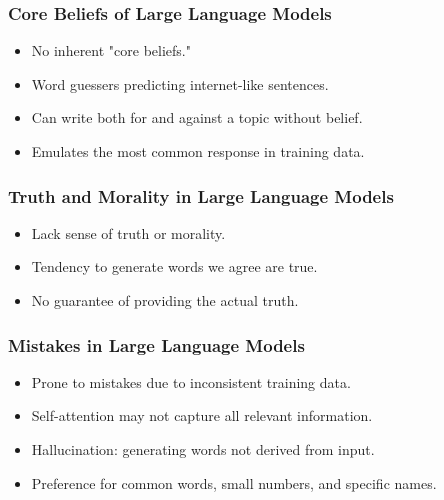 
\begin{frame}[fragile]\frametitle{Core Beliefs of Large Language Models}
  \begin{itemize}
    \item No inherent "core beliefs."
    \item Word guessers predicting internet-like sentences.
    \item Can write both for and against a topic without belief.
    \item Emulates the most common response in training data.
  \end{itemize}
\end{frame}

\begin{frame}[fragile]\frametitle{Truth and Morality in Large Language Models}
  \begin{itemize}
    \item Lack sense of truth or morality.
    \item Tendency to generate words we agree are true.
    \item No guarantee of providing the actual truth.
  \end{itemize}
\end{frame}

\begin{frame}[fragile]\frametitle{Mistakes in Large Language Models}
  \begin{itemize}
    \item Prone to mistakes due to inconsistent training data.
    \item Self-attention may not capture all relevant information.
    \item Hallucination: generating words not derived from input.
    \item Preference for common words, small numbers, and specific names.
  \end{itemize}
\end{frame}

